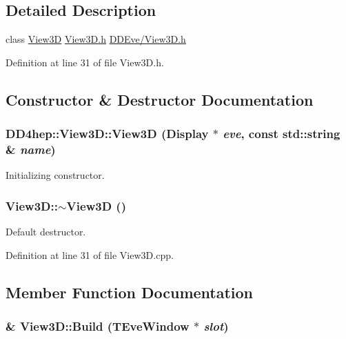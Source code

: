 \subsection{Detailed Description}
class \hyperlink{class_d_d4hep_1_1_view3_d}{View3D} \hyperlink{_view3_d_8h}{View3D.h} \hyperlink{_view3_d_8h}{DDEve/View3D.h} 

Definition at line 31 of file View3D.h.

\subsection{Constructor \& Destructor Documentation}
\hypertarget{class_d_d4hep_1_1_view3_d_aec5a272c7c13401f3c40cf51170b9ace}{
\subsubsection[{View3D}]{\setlength{\rightskip}{0pt plus 5cm}DD4hep::View3D::View3D ({\bf Display} $\ast$ {\em eve}, \/  const std::string \& {\em name})}}
\label{class_d_d4hep_1_1_view3_d_aec5a272c7c13401f3c40cf51170b9ace}


Initializing constructor. \hypertarget{class_d_d4hep_1_1_view3_d_a54e79a96844ebb7e5337622cf65188aa}{
\subsubsection[{$\sim$View3D}]{\setlength{\rightskip}{0pt plus 5cm}View3D::$\sim$View3D ()}}
\label{class_d_d4hep_1_1_view3_d_a54e79a96844ebb7e5337622cf65188aa}


Default destructor. 

Definition at line 31 of file View3D.cpp.

\subsection{Member Function Documentation}
\hypertarget{class_d_d4hep_1_1_view3_d_a8067ea1bbbbcf503e271acd7dcace79f}{
\subsubsection[{Build}]{ \& View3D::Build (TEveWindow $\ast$ {\em slot})}}
\label{class_d_d4hep_1_1_view3_d_a8067ea1bbbbcf503e271acd7dcace79f}


